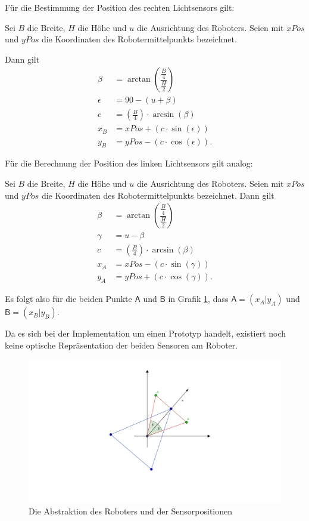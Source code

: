 \documentclass[paper=a4, DIV=calc, BCOR=12mm, twoside=on, onecolumn=on, open = right, titlepage =on, parskip =half-, headsepline = on, footsepline = off, chapterprefix = off, appendixprefix = on, fontsize = 12pt, numbers = noenddot, abstract = on]{scrbook}
\begin{document}
Für die Bestimmung der Position des rechten Lichtsensors gilt:

Sei $B$ die Breite, $H$ die Höhe und $u$ die Ausrichtung des Roboters. Seien mit $xPos$ und $yPos$ die Koordinaten des Robotermittelpunkts bezeichnet.

Dann gilt
\renewcommand\arraystretch{3}
\begin{align*}
\beta & = \arctan \left( \dfrac{\frac{B}{4}}{\frac{H}{2}} \right)\\
\epsilon & = 90 - (u + \beta)\\
c & = \left( \frac{B}{4} \right) \cdot \arcsin (\beta)\\
x_B & = xPos + \left( c \cdot \sin(\epsilon) \right)\\
y_B & = yPos - \left( c \cdot \cos(\epsilon) \right).
\end{align*}

Für die Berechnung der Position des linken Lichtsensors gilt analog:

Sei $B$ die Breite, $H$ die Höhe und $u$ die Ausrichtung des Roboters. Seien mit $xPos$ und $yPos$ die Koordinaten des Robotermittelpunkts bezeichnet. Dann gilt
\renewcommand\arraystretch{3}
\begin{align*}
\beta & = \arctan \left( \dfrac{\frac{B}{4}}{\frac{H}{2}} \right)\\
\gamma & = u - \beta\\
c & = \left( \frac{B}{4} \right) \cdot \arcsin (\beta)\\
x_A & = xPos - \left( c \cdot \sin(\gamma) \right)\\
y_A & = yPos + \left( c \cdot \cos(\gamma) \right).
\end{align*}

Es folgt also für die beiden Punkte $\mathsf{A}$ und $\mathsf{B}$ in Grafik \ref{fig:roboter_abstrakt}, dass $\mathsf{A} = \left( x_A \vert y_A \right)$ und $\mathsf{B} = \left( x_B \vert y_B \right)$.


Da es sich bei der Implementation um einen Prototyp handelt, existiert noch keine optische Repräsentation der beiden Sensoren am Roboter. 

\begin{figure}[htb]
\centering
\hspace*{-6em}\includegraphics[scale=1.1]{images/lichtsensorgrafik.png} 
\caption{Die Abstraktion des Roboters und der Sensorpositionen}
\label{fig:roboter_abstrakt}
\end{figure}
\end{document}
